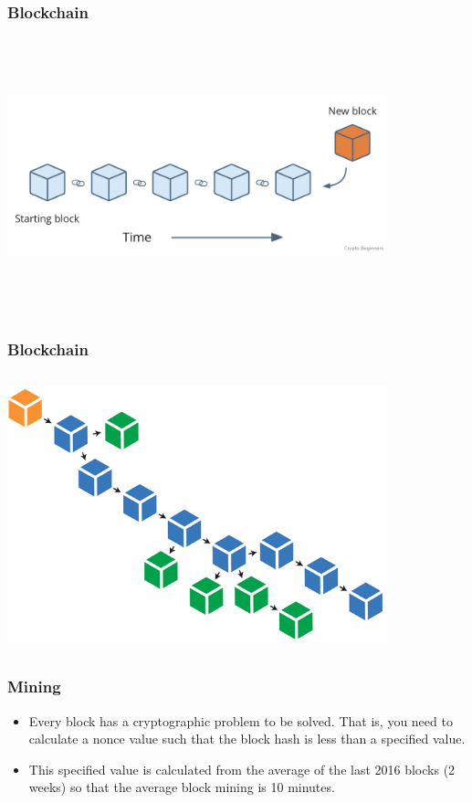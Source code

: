 \documentclass{beamer}
\begin{document}
\begin{frame}
\frametitle{Blockchain}
\includegraphics[width=11cm, height=8cm]{blockchain1}
\end{frame}

\begin{frame}
\frametitle{Blockchain}
\includegraphics[width=11cm, height=8cm]{blockchain2}
\end{frame}


\begin{frame}
   \frametitle{Mining}
   \begin{itemize}[<+->]
     \item Every block has a cryptographic problem to be solved. That is,
       you need to calculate a nonce value such that the block hash is less than a specified value.
     \item This specified value is calculated from the average of the last 2016 blocks (2 weeks)
       so that the average block mining is 10 minutes.
   \end{itemize}
\end{frame}
\end{document}
